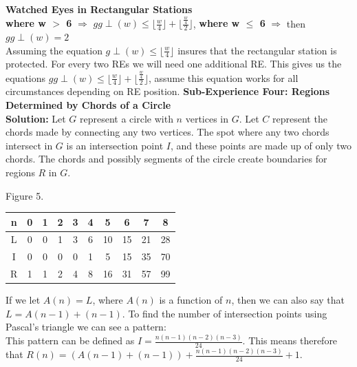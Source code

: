 \documentclass[10pt,a4paper]{report}
\begin{document}
	\textbf{Watched Eyes in Rectangular Stations}\\
	\textbf{where w $>$ 6} $\Longrightarrow$  $gg\perp(w) \leq \lfloor \frac{w}{4} \rfloor + \lfloor \frac{\frac{w}{4}}{2} \rfloor$, \textbf{where w $\leq$ 6} $\Longrightarrow$ then $gg\perp(w) = 2$\\
	Assuming the equation $g\perp(w) \leq \lfloor \frac{w}{4}\rfloor $ insures that the rectangular station is protected.  For every two REs we will need one additional RE.  This gives us the equations $gg\perp(w) \leq \lfloor \frac{w}{4} \rfloor + \lfloor \frac{\frac{w}{4}}{2} \rfloor$, assume this equation works for all circumstances depending on RE position. 
	\pagebreak
	\newline
	\textbf{Sub-Experience Four: Regions Determined by Chords of a Circle}\\
	
	\noindent\textbf{Solution: }Let $G$ represent a circle with $n$ vertices in $G$.  Let $C$ represent the chords made by connecting any two vertices.  The spot where any two chords intersect in $G$ is an intersection point $I$, and these points are made up of only two chords.  The chords and possibly segments of the circle create boundaries for regions $R$ in $G$.\\
	
	\begin{center}
		Figure 5.\\
		\begin{tabular}{c|c c c c c c c c c}
			n & 0 & 1 & 2 & 3 & 4 & 5 & 6 & 7 & 8\\
			\hline
			\hline
			L & 0 & 0 & 1 & 3 & 6 & 10 & 15 & 21 & 28\\
			I & 0 & 0 & 0 & 0 & 1 & 5 & 15 & 35 & 70\\
			R & 1 & 1 & 2 & 4 & 8 & 16 & 31 & 57 & 99\\
		\end{tabular}
	\end{center}
	
	\noindent If we let $A(n)=L$, where $A(n)$ is a function of $n$, then we can also say that $L=A(n-1)+(n-1)$.  To find the number of intersection points using Pascal's triangle we can see a pattern:\\
	
	\noindent This pattern can be defined as $I=\frac{n(n-1)(n-2)(n-3)}{24}$.  This means therefore that $R(n)=(A(n-1)+(n-1))+\frac{n(n-1)(n-2)(n-3)}{24}+1$.
	
\end{document}

